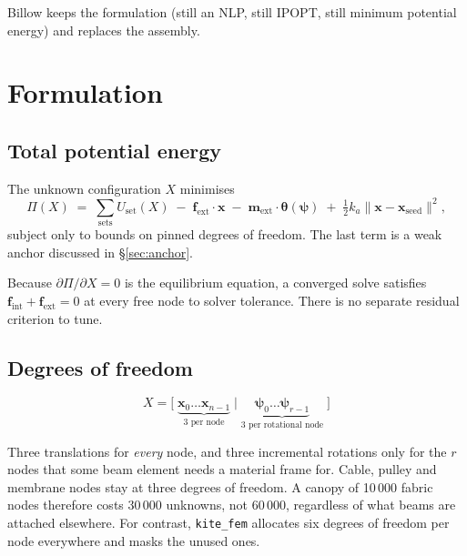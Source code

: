 \documentclass[11pt,a4paper]{article}
\newcommand{\code}[1]{\texttt{\small #1}}
\begin{document}
Billow keeps the formulation (still an NLP, still IPOPT, still minimum potential
energy) and replaces the assembly.

\section{Formulation}

\subsection{Total potential energy}

The unknown configuration $X$ minimises
\begin{equation}
  \Pi(X) \;=\; \sum_{\text{sets}} U_{\text{set}}(X)
  \;-\; \mathbf{f}_{\text{ext}}\!\cdot\!\mathbf{x}
  \;-\; \mathbf{m}_{\text{ext}}\!\cdot\!\boldsymbol{\theta}(\boldsymbol{\psi})
  \;+\; \tfrac{1}{2}k_a\lVert \mathbf{x}-\mathbf{x}_{\text{seed}}\rVert^2 ,
  \label{eq:pi}
\end{equation}
subject only to bounds on pinned degrees of freedom. The last term is a weak
anchor discussed in \S\ref{sec:anchor}.

Because $\partial\Pi/\partial X = 0$ is the equilibrium equation, a converged
solve satisfies $\mathbf{f}_{\text{int}} + \mathbf{f}_{\text{ext}} = 0$ at every
free node to solver tolerance. There is no separate residual criterion to tune.

\subsection{Degrees of freedom}

\begin{equation}
  X = \big[\; \underbrace{\mathbf{x}_0 \ldots \mathbf{x}_{n-1}}_{\text{3 per node}}
  \;\big|\;
  \underbrace{\boldsymbol{\psi}_0 \ldots \boldsymbol{\psi}_{r-1}}_{\text{3 per rotational node}} \;\big]
\end{equation}

Three translations for \emph{every} node, and three incremental rotations only
for the $r$ nodes that some beam element needs a material frame for. Cable,
pulley and membrane nodes stay at three degrees of freedom. A canopy of 10\,000
fabric nodes therefore costs 30\,000 unknowns, not 60\,000, regardless of what
beams are attached elsewhere. For contrast, \code{kite\_fem} allocates six
degrees of freedom per node everywhere and masks the unused ones.
\end{document}
